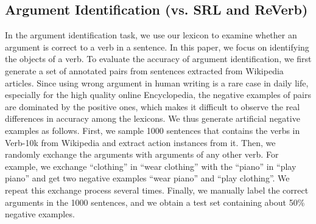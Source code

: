 \subsection{Argument Identification (vs. SRL and ReVerb)}
\label{sec:ai}
%
%
In the argument identification task, we use our lexicon to examine
whether an argument is correct to a verb in a sentence.
In this paper, we focus on identifying the objects of a verb. To evaluate
the accuracy of argument identification, we first generate a set of
annotated  pairs from sentences extracted from Wikipedia
articles. Since using wrong argument in human writing is a rare case in daily life, especially
for the high quality online Encyclopedia, the
negative examples of  pairs are dominated by the positive
ones, which makes it difficult to observe the real differences in accuracy
among the lexicons. We thus generate artificial negative examples as follows.
First, we sample 1000 sentences that contains the verbs in
Verb-10k from Wikipedia and extract action instances from it. Then, we
randomly exchange the arguments with arguments of any other verb. For
example, we exchange ``clothing'' in ``wear clothing'' with the ``piano''
in ``play piano'' and get two negative examples ``wear piano''
and ``play clothing''.
We repeat this exchange process several times. Finally, we manually
label the correct arguments in the 1000 sentences, and we obtain a test set
containing about 50\% negative examples.



